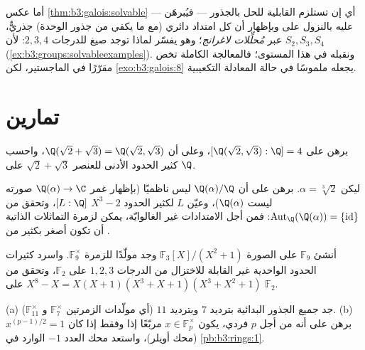 \begin{remark}\label{rem:b3:galois:converse}
أما عكس \cref{thm:b3:galois:solvable} --- أي إن   تستلزم
القابلية للحل بالجذور --- فيُبرهَن عليه بالنزول على  وبإظهار أن كل امتداد دائري (مع ما يكفي من جذور الوحدة)
جذريٌّ، عبر \emph{مُحلِّلات لاغرانج}؛ وهو يفسّر لماذا توجد صيغ
للدرجات $2, 3, 4$: لأن $S_2, S_3, S_4$ 
(\cref{ex:b3:groups:solvableexamples}). ونقبله في هذا المستوى؛ فالمعالجة الكاملة تخص
مقرّرًا في الماجستير، لكن \cref{exo:b3:galois:8} يجعله ملموسًا في حالة
المعادلة التكعيبية.
\end{remark}

\section{تمارين}

\begin{exercise}[$\star$]\label{exo:b3:galois:1}
برهن على $[\Q(\sqrt2, \sqrt3):\Q] = 4$، وعلى أن $\Q(\sqrt2 + \sqrt3) =
\Q(\sqrt2, \sqrt3)$، واحسب كثير الحدود الأدنى
للعنصر $\sqrt2 + \sqrt3$ على $\Q$.
\end{exercise}

\begin{exercise}[$\star$]\label{exo:b3:galois:2}
ليكن $\alpha = \sqrt[3]2$. برهن على أن $\Q(\alpha)/\Q$ ليس ناظميًا (بإظهار
غمر $\Q(\alpha) \to \C$ صورته ليست $\Q(\alpha)$)، وعيّن  $L$
لكثير الحدود $X^3 -
2$  $[L:\Q]$، وتحقق من $\operatorname{Aut}_\Q(\Q(\alpha)) =
\{\mathrm{id}\}$: فمن
أجل الامتدادات غير الغالوايّة، يمكن لزمرة التماثلات الذاتية أن
تكون أصغر بكثير من .
\end{exercise}

\begin{exercise}[$\star$]\label{exo:b3:galois:3}
أنشئ $\mathbb F_9$ على الصورة $\mathbb F_3[X]/(X^2+1)$ وجد مولّدًا للزمرة $\mathbb F_9^\times$.
واسرد كثيرات الحدود الواحدية غير القابلة للاختزال من الدرجات
$1, 2, 3$ على $\mathbb F_2$، وتحقق من $X^8 - X = X(X+1)(X^3+X+1)(X^3+X^2+1)$ على $\mathbb F_2$.
\end{exercise}

\begin{exercise}[$\star\star$]\label{exo:b3:galois:4}
(a) جد جميع الجذور البدائية بترديد $7$ وبترديد $11$ (أي مولّدات
الزمرتين $\mathbb F_7^\times$ و $\mathbb F_{11}^\times$).
(b) برهن على أنه من أجل $p$ فردي، يكون $x \in \mathbb F_p^\times$ مربّعًا إذا وفقط
إذا كان $x^{(p-1)/2} = 1$ (محك أويلر)، واستعد محك العدد $-1$ الوارد
في \cref{pb:b3:rings:1}.
\end{exercise}


